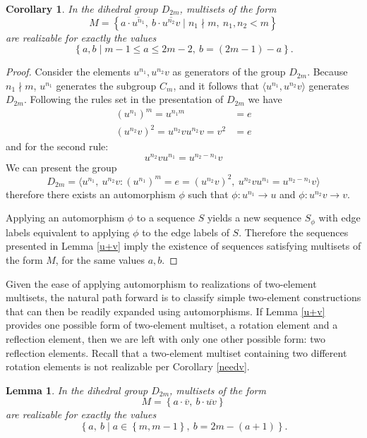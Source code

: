 \documentclass[12pt]{article}
\newtheorem{lem}[thm]{Lemma}
\newtheorem{cor}[thm]{Corollary}
\newcommand{\ba}{\[\begin{aligned}}
\newcommand{\ea}{\end{aligned}\]}
\newcommand{\setof}[1]{\left\{#1\right\}}
\newcommand{\setdef}[2]{\left\{#1\mid#2\right\}}
\newcommand{\gen}[1]{\langle#1\rangle} %
\newcommand{\ol}[1]{\overline{#1}} %
\begin{document}
\begin{cor} \label{un} In the dihedral group $D_{2m}$, multisets of the form
$$M = \setdef{a \cdot \ol{u^{n_1}},\ b \cdot \ol{u^{n_2}v}}{n_1 \nmid m,\ n_1, n_2 < m}$$
are realizable for exactly the values
$$\setdef{a, b}{ m - 1 \leq a \leq 2m - 2,\ b = (2m - 1) - a}.$$
\end{cor}
\begin{proof}
  Consider the elements $u^{n_1}, u^{n_2}v$ as generators of the group $D_{2m}$.
  Because $n_1 \nmid m$, $u^{n_1}$ generates the subgroup $C_m$, and it follows
  that $\gen{u^{n_1}, u^{n_2}v}$ generates $D_{2m}$. Following the rules set
  in the presentation of $D_{2m}$ we have
  \ba
  (u^{n_1})^m = u^{n_1m} &= e\\
  (u^{n_2}v)^2 = u^{n_2}vu^{n_2}v = v^2 &= e
  \ea
  and for the second rule:
  $$u^{n_2}vu^{n_1} = u^{n_2 - n_1}v$$
  We can present the group
  $$D_{2m} = \gen{u^{n_1},\ u^{n_2}v : (u^{n_1})^m = e = (u^{n_2}v)^2,\ u^{n_2}vu^{n_1} = u^{n_2-n_1}v}$$
  therefore there exists an automorphism $\phi$ such that $\phi : u^{n_1} \to u$ and $\phi : u^{n_2}v \to v$.

  Applying an automorphism $\phi$ to a sequence $S$ yields a new sequence $S_{\phi}$ with edge labels
  equivalent to applying $\phi$ to the edge labels of $S$. Therefore the sequences presented
  in Lemma \ref{u+v} imply the existence of sequences satisfying multisets of the form $M$, for
  the same values $a,b$.
\end{proof}

Given the ease of applying automorphism to realizations of two-element multisets, the natural path
forward is to classify simple two-element constructions that can then be readily expanded
using automorphisms. If Lemma \ref{u+v} provides one possible form of two-element multiset,
a rotation element and a reflection element, then we are left with only one other possible form:
two reflection elements. Recall that a two-element multiset containing two different rotation elements
is not realizable per Corollary \ref{needv}.

\begin{lem} \label{unv} In the dihedral group $D_{2m}$, multisets of the form
$$M = \setof{a \cdot \ol{v},\ b \cdot \ol{uv}}$$
are realizable for exactly the values
$$\setdef{a,\ b}{a \in \setof{m, m-1},\ b = 2m - (a + 1)}.$$
\end{lem}
\end{document}

